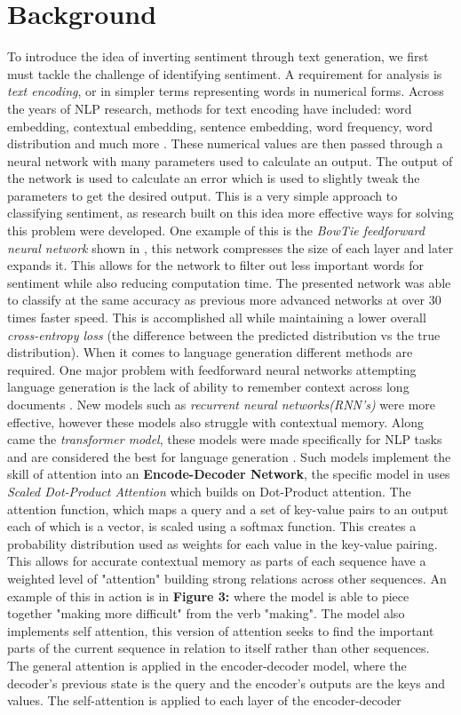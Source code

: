 \documentclass{article}
\begin{document}
\section{Background}
	To introduce the idea of inverting sentiment through text generation, we first must tackle the challenge of identifying sentiment. A requirement for analysis is \textit{text encoding}, or in simpler terms representing words in numerical forms. Across the years of NLP research, methods for text encoding have included: word embedding, contextual embedding, sentence embedding, word frequency, word distribution and much more \cite{Sent}. These numerical values are then passed through a neural network with many parameters used to calculate an output. The output of the network is used to calculate an error which is used to slightly tweak the parameters to get the desired output. This is a very simple approach to classifying sentiment, as research built on this idea more effective ways for solving this problem were developed. One example of this is the \textit{BowTie feedforward neural network} shown in \cite{Sent}, this network compresses the size of each layer and later expands it. This allows for the network to filter out less important words for sentiment while also reducing computation time. The presented network was able to classify at the same accuracy as previous more advanced networks at over 30 times faster speed. This is accomplished all while maintaining a lower overall \textit{cross-entropy loss} (the difference between the predicted distribution vs the true distribution). When it comes to language generation different methods are required. One major problem with feedforward neural networks attempting language generation is the lack of ability to remember context across long documents \cite{LG,CM}. New models such as \textit{recurrent neural networks(RNN's)} were more effective, however these models also struggle with contextual memory\cite{LG}. Along came the \textit{transformer model}, these models were made specifically for NLP tasks and are considered the best for language generation \cite{TF}. Such models implement the skill of attention into an \textbf{Encode-Decoder Network}, the specific model in \cite{TF} uses \textit{Scaled Dot-Product Attention} which builds on Dot-Product attention. The attention function, which maps a query and a set of key-value pairs to an output each of which is a vector, is scaled using a softmax function. This creates a probability distribution used as weights for each value in the key-value pairing. This allows for accurate contextual memory as parts of each sequence have a weighted level of "attention" building strong relations across other sequences. An example of this in action is in \textbf{Figure 3:\cite{TF}} where the model is able to piece together "making more difficult" from the verb "making". The model also implements self attention, this version of attention seeks to find the important parts of the current sequence in relation to itself rather than other sequences. The general attention is applied in the encoder-decoder model, where the decoder's previous state is the query and the encoder's outputs are the keys and values. The self-attention is applied to each layer of the encoder-decoder 
\end{document}
